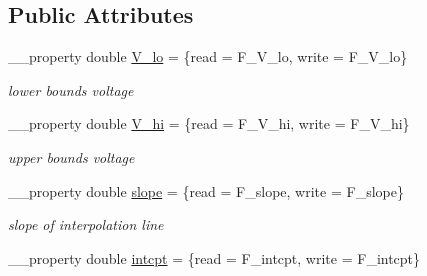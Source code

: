 \subsection*{Public Attributes}
\begin{DoxyCompactItemize}
\item 
\hypertarget{class_t_h_h_linear_piecewise_kinetics_factor_a64c5bc29239227eaaa3ea0b0ae618502}{\+\_\+\+\_\+property double \hyperlink{class_t_h_h_linear_piecewise_kinetics_factor_a64c5bc29239227eaaa3ea0b0ae618502}{V\+\_\+lo} = \{read = F\+\_\+\+V\+\_\+lo, write = F\+\_\+\+V\+\_\+lo\}}\label{class_t_h_h_linear_piecewise_kinetics_factor_a64c5bc29239227eaaa3ea0b0ae618502}

\begin{DoxyCompactList}\small\item\em lower bounds voltage \end{DoxyCompactList}\item 
\hypertarget{class_t_h_h_linear_piecewise_kinetics_factor_aa9b1e3cabc1f97b189eda776db677836}{\+\_\+\+\_\+property double \hyperlink{class_t_h_h_linear_piecewise_kinetics_factor_aa9b1e3cabc1f97b189eda776db677836}{V\+\_\+hi} = \{read = F\+\_\+\+V\+\_\+hi, write = F\+\_\+\+V\+\_\+hi\}}\label{class_t_h_h_linear_piecewise_kinetics_factor_aa9b1e3cabc1f97b189eda776db677836}

\begin{DoxyCompactList}\small\item\em upper bounds voltage \end{DoxyCompactList}\item 
\hypertarget{class_t_h_h_linear_piecewise_kinetics_factor_a1accd3668b53a88fa047c17695f8b6a7}{\+\_\+\+\_\+property double \hyperlink{class_t_h_h_linear_piecewise_kinetics_factor_a1accd3668b53a88fa047c17695f8b6a7}{slope} = \{read = F\+\_\+slope, write = F\+\_\+slope\}}\label{class_t_h_h_linear_piecewise_kinetics_factor_a1accd3668b53a88fa047c17695f8b6a7}

\begin{DoxyCompactList}\small\item\em slope of interpolation line \end{DoxyCompactList}\item 
\hypertarget{class_t_h_h_linear_piecewise_kinetics_factor_ab71596e55e35b7f1562b01ef46f0ed98}{\+\_\+\+\_\+property double \hyperlink{class_t_h_h_linear_piecewise_kinetics_factor_ab71596e55e35b7f1562b01ef46f0ed98}{intcpt} = \{read = F\+\_\+intcpt, write = F\+\_\+intcpt\}}\label{class_t_h_h_linear_piecewise_kinetics_factor_ab71596e55e35b7f1562b01ef46f0ed98}


\end{DoxyCompactItemize}
